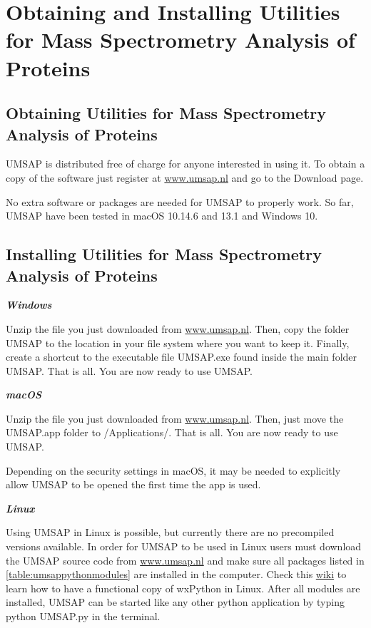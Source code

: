 \chapter{Obtaining and Installing Utilities for Mass Spectrometry Analysis of Proteins}

\section{Obtaining Utilities for Mass Spectrometry Analysis of Proteins}

UMSAP is distributed free of charge for anyone interested in using it. To obtain
a copy of the software just register at \href{https://www.umsap.nl}{www.umsap.nl}
and go to the Download page.

No extra software or packages are needed for UMSAP to properly work. So far,
UMSAP have been tested in macOS \num[parse-numbers=false]{10.14.6} and
\num[parse-numbers=false]{13.1} and Windows \num{10}.

\section{Installing Utilities for Mass Spectrometry Analysis of Proteins}

\textit{\textbf{Windows}}

Unzip the file you just downloaded from \href{https://www.umsap.nl}{www.umsap.nl}.
Then, copy the folder UMSAP to the location in your file system where you want
to keep it. Finally, create a shortcut to the executable file UMSAP.exe found
inside the main folder UMSAP. That is all. You are now ready to use UMSAP.

\textit{\textbf{macOS}}

Unzip the file you just downloaded from \href{https://www.umsap.nl}{www.umsap.nl}.
Then, just move the UMSAP.app folder to /Applications/. That is all. You are now
ready to use UMSAP.

Depending on the security settings in macOS, it may be needed to explicitly allow
UMSAP to be opened the first time the app is used.

\textit{\textbf{Linux}}

Using UMSAP in Linux is possible, but currently there are no precompiled versions
available. In order for UMSAP to be used in Linux users must download the UMSAP source
code from \href{https://www.umsap.nl}{www.umsap.nl} and make sure all packages listed
in \autoref{table:umsappythonmodules} are installed in the computer. Check this
\href{https://wiki.wxpython.org/How%20to%20install%20wxPython}{wiki} to learn
how to have a functional copy of wxPython in Linux. After all modules are installed,
UMSAP can be started like any other python application by typing python UMSAP.py in
the terminal.

